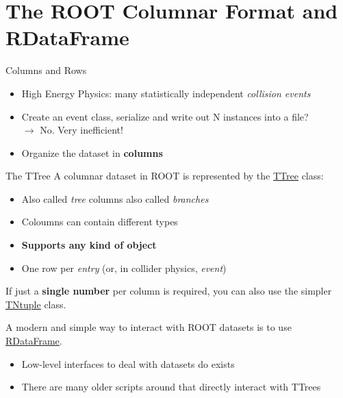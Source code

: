 \documentclass[aspectratio=169]{beamer}
\newcommand{\myfigure}[2]{
    \begin{figure}
        \makebox[\textwidth]{%
            \texttt{[image: \#2]}
        }
    \end{figure}
}
\newcommand{\myhref}[2]{{\color{blue}\href{#1}{\underline{#2}}}}
\begin{document}
\section{The ROOT Columnar Format and RDataFrame}

\begin{frame}{Columns and Rows}
    \begin{itemize}
        \item High Energy Physics: many statistically independent \textit{collision events}
        \item Create an event class, serialize and write out N instances into a file?
            \\ $\rightarrow$ No. Very inefficient!
        \item Organize the dataset in \textbf{columns}
    \end{itemize}
    \myfigure{0.8}{column-representation.png}
\end{frame}

\begin{frame}{The TTree}
    A columnar dataset in ROOT is represented by the \myhref{https://root.cern.ch/doc/master/classTTree.html}{TTree} class:
    \vspace{3mm}
    \begin{itemize}
        \item Also called \textit{tree} columns also called \textit{branches}
        \item Coloumns can contain different types
        \item \textbf{Supports any kind of object}
        \item One row per \textit{entry} (or, in collider physics, \textit{event})
    \end{itemize}
    \vspace{3mm}
    If just a \textbf{single number} per column is required, you can also use the simpler \myhref{https://root.cern.ch/doc/master/classTNtuple.html}{TNtuple} class.

    \vspace{3mm}

    {\color{darkgreen} A modern and simple way to interact with ROOT datasets is to use \myhref{https://root.cern/doc/master/classROOT_1_1RDataFrame.html}{RDataFrame}}.
    \vspace{3mm}
    \begin{itemize}
        \item Low-level interfaces to deal with datasets do exists
        \item There are many older scripts around that directly interact with TTrees
    \end{itemize}
\end{frame}
\end{document}
